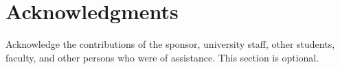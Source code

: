 \chapter{Acknowledgments}
Acknowledge the contributions of the sponsor, university staff, other students, faculty, and other persons who were of assistance. This section is optional.
